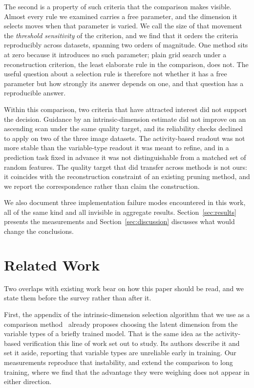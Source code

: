 \documentclass[make,article,submit,pdftex,moreauthors]{Definitions/mdpi}
\begin{document}
The second is a property of such criteria that the comparison makes
visible. Almost every rule we examined carries a free parameter, and the
dimension it selects moves when that parameter is varied. We call the size
of that movement the \emph{threshold sensitivity} of the criterion, and we
find that it orders the criteria reproducibly across datasets, spanning
two orders of magnitude. One method sits at zero because it introduces no
such parameter; plain grid search under a reconstruction criterion, the
least elaborate rule in the comparison, does not. The useful question
about a selection rule is therefore not whether it has a free parameter
but how strongly its answer depends on one, and that question has a
reproducible answer.

Within this comparison, two criteria that have attracted interest did not
support the decision. Guidance by an intrinsic-dimension estimate did not
improve on an ascending scan under the same quality target, and its
reliability checks declined to apply on two of the three image datasets.
The activity-based readout was not more stable than the variable-type
readout it was meant to refine, and in a prediction task fixed in advance
it was not distinguishable from a matched set of random features. The
quality target that did transfer across methods is not ours: it coincides
with the reconstruction constraint of an existing pruning method, and we
report the correspondence rather than claim the construction.

We also document three implementation failure modes encountered in this
work, all of the same kind and all invisible in aggregate results.
Section~\ref{sec:results} presents the measurements and
Section~\ref{sec:discussion} discusses what would change the conclusions.

\section{Related Work}\label{sec:related}

Two overlaps with existing work bear on how this paper should be read, and
we state them before the survey rather than after it.

First, the appendix of the intrinsic-dimension selection algorithm that we
use as a comparison method~\cite{bonheme2022fondue} already proposes choosing the latent dimension
from the variable types of a briefly trained model. That is the same idea
as the activity-based verification this line of work set out to study. Its
authors describe it and set it aside, reporting that variable types are
unreliable early in training. Our measurements reproduce that instability,
and extend the comparison to long training, where we find that the
advantage they were weighing does not appear in either direction.
\end{document}

